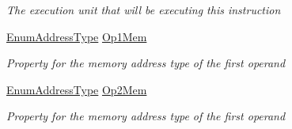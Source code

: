 \begin{DoxyCompactItemize}
\begin{DoxyCompactList}\small\item\em The execution unit that will be executing this instruction \end{DoxyCompactList}\item 
\hyperlink{namespace_c_p_u___o_s___simulator_1_1_c_p_u_ab76721f84dabbc14c907e6f11fbeb7c0}{Enum\+Address\+Type} \hyperlink{class_c_p_u___o_s___simulator_1_1_c_p_u_1_1_instruction_ace925ca0ada700c9796af9c1d66183d4}{Op1\+Mem}
\begin{DoxyCompactList}\small\item\em Property for the memory address type of the first operand \end{DoxyCompactList}\item 
\hyperlink{namespace_c_p_u___o_s___simulator_1_1_c_p_u_ab76721f84dabbc14c907e6f11fbeb7c0}{Enum\+Address\+Type} \hyperlink{class_c_p_u___o_s___simulator_1_1_c_p_u_1_1_instruction_a7351e4bad5ab2b63691187aecd01c1f0}{Op2\+Mem}
\begin{DoxyCompactList}\small\item\em Property for the memory address type of the first operand \end{DoxyCompactList}\end{DoxyCompactItemize}
